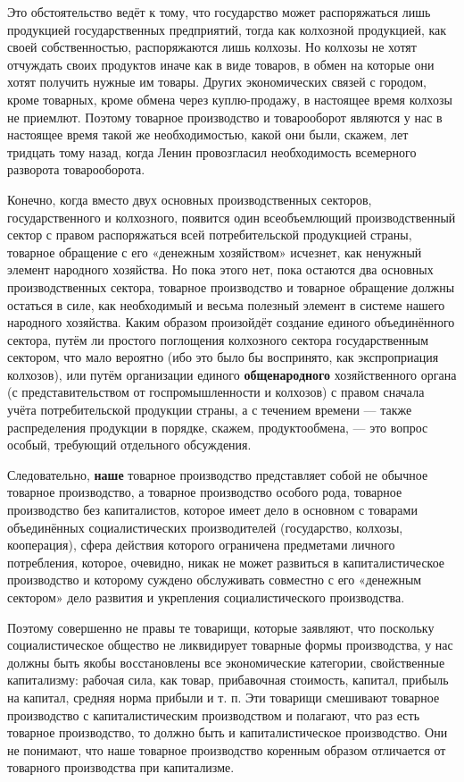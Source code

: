 \documentclass[12pt, a4paper, openany]{book}
\begin{document}
Это обстоятельство ведёт к тому, что государство может распоряжаться лишь продукцией государственных предприятий, тогда как колхозной продукцией, как своей собственностью, распоряжаются лишь колхозы. Но колхозы не хотят отчуждать своих продуктов иначе как в виде товаров, в обмен на которые они хотят получить нужные им товары. Других экономических связей с городом, кроме товарных, кроме обмена через куплю-продажу, в настоящее время колхозы не приемлют. Поэтому товарное производство и товарооборот являются у нас в настоящее время такой же необходимостью, какой они были, скажем, лет тридцать тому назад, когда Ленин провозгласил необходимость всемерного разворота товарооборота.



Конечно, когда вместо двух основных производственных секторов, государственного и колхозного, появится один всеобъемлющий производственный сектор с правом распоряжаться всей потребительской продукцией страны, товарное обращение с его «денежным хозяйством» исчезнет, как ненужный элемент народного хозяйства. Но пока этого нет, пока остаются два основных производственных сектора, товарное производство и товарное обращение должны остаться в силе, как необходимый и весьма полезный элемент в системе нашего народного хозяйства. Каким образом произойдёт создание единого объединённого сектора, путём ли простого поглощения колхозного сектора государственным сектором, что мало вероятно (ибо это было бы воспринято, как экспроприация колхозов), или путём организации единого \textbf{общенародного} хозяйственного органа (с представительством от госпромышленности и колхозов) с правом сначала учёта потребительской продукции страны, а с течением времени — также распределения продукции в порядке, скажем, продуктообмена, — это вопрос особый, требующий отдельного обсуждения.



Следовательно, \textbf{наше} товарное производство представляет собой не обычное товарное производство, а товарное производство особого рода, товарное производство без капиталистов, которое имеет дело в основном с товарами объединённых социалистических производителей (государство, колхозы, кооперация), сфера действия которого ограничена предметами личного потребления, которое, очевидно, никак не может развиться в капиталистическое производство и которому суждено обслуживать совместно с его «денежным сектором» дело развития и укрепления социалистического производства.



Поэтому совершенно не правы те товарищи, которые заявляют, что поскольку социалистическое общество не ликвидирует товарные формы производства, у нас должны быть якобы восстановлены все экономические категории, свойственные капитализму: рабочая сила, как товар, прибавочная стоимость, капитал, прибыль на капитал, средняя норма прибыли и т. п. Эти товарищи смешивают товарное производство с капиталистическим производством и полагают, что раз есть товарное производство, то должно быть и капиталистическое производство. Они не понимают, что наше товарное производство коренным образом отличается от товарного производства при капитализме.
\end{document}
